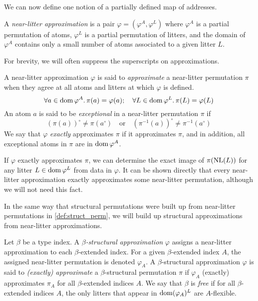 We can now define one notion of a partially defined map of addresses.

\begin{definition}
    A \emph{near-litter approximation} is a pair \( \varphi = (\varphi^A, \varphi^L) \) where \( \varphi^A \) is a partial permutation of atoms, \( \varphi^L \) is a partial permutation of litters, and the domain of \( \varphi^A \) contains only a small number of atoms associated to a given litter \( L \).
\end{definition}

For brevity, we will often suppress the superscripts on approximations.

\begin{definition}
    A near-litter approximation \( \varphi \) is said to \emph{approximate} a near-litter permutation \( \pi \) when they agree at all atoms and litters at which \( \varphi \) is defined.
    \[ \forall a \in \operatorname{dom} \varphi^A.\, \pi(a) = \varphi(a);\quad \forall L \in \operatorname{dom} \varphi^L.\, \pi(L) = \varphi(L) \]
    An atom \( a \) is said to be \emph{exceptional} in a near-litter permutation \( \pi \) if \[ (\pi(a))^\circ \neq \pi(a^\circ) \quad\text{or}\quad (\pi^{-1}(a))^\circ \neq \pi^{-1}(a^\circ) \]
    We say that \( \varphi \) \emph{exactly} approximates \( \pi \) if it approximates \( \pi \), and in addition, all exceptional atoms in \( \pi \) are in \( \operatorname{dom} \varphi^A \).
\end{definition}

\begin{remark}
    If \( \varphi \) exactly approximates \( \pi \), we can determine the exact image of \( \pi(\operatorname{NL}(L)) \) for any litter \( L \in \operatorname{dom} \varphi^L \) from data in \( \varphi \).
    It can be shown directly that every near-litter approximation exactly approximates some near-litter permutation, although we will not need this fact.
\end{remark}

In the same way that structural permutations were built up from near-litter permutations in \cref{def:struct_perm}, we will build up structural approximations from near-litter approximations.

\begin{definition}
    Let \( \beta \) be a type index.
    A \emph{\( \beta \)-structural approximation} \( \varphi \) assigns a near-litter approximation to each \( \beta \)-extended index.
    For a given \( \beta \)-extended index \( A \), the assigned near-litter permutation is denoted \( \varphi_A \).
    A \( \beta \)-structural approximation \( \varphi \) is said to \emph{(exactly) approximate} a \( \beta \)-structural permutation \( \pi \) if \( \varphi_A \) (exactly) approximates \( \pi_A \) for all \( \beta \)-extended indices \( A \).
    We say that \( \beta \) is \emph{free} if for all \( \beta \)-extended indices \( A \), the only litters that appear in \( \operatorname{dom} (\varphi_A)^L \) are \( A \)-flexible.
\end{definition}

